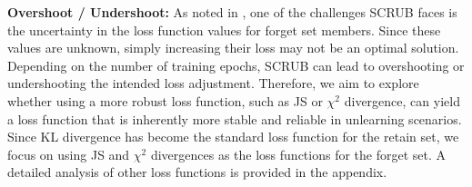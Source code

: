 \documentclass{article} %
\begin{document}
\begin{table*}[t]
    \centering
        \caption{Forgetting scenarios.}
    \label{tab:forgetting_scenarios}

    \vspace{-0.2in}
\end{table*}
\textbf{Overshoot / Undershoot:} As noted in \cite{georgiev2024attributetodeletemachineunlearningdatamodel}, one of the challenges SCRUB faces is the uncertainty in the loss function values for forget set members. Since these values are unknown, simply increasing their loss may not be an optimal solution. Depending on the number of training epochs, SCRUB can lead to overshooting or undershooting the intended loss adjustment. Therefore, we aim to explore whether using a more robust loss function, such as JS or $\chi^2$ divergence, can yield a loss function that is inherently more stable and reliable in unlearning scenarios.
Since KL divergence has become the standard loss function for the retain set, we focus on using JS and $\chi^2$ divergences as the loss functions for the forget set. A detailed analysis of other loss functions is provided in the appendix.
\end{document}
